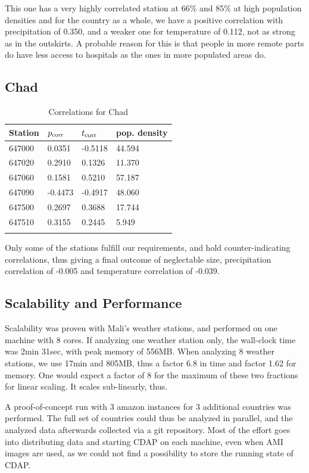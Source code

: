 \documentclass[
10pt, %
a4paper, %
oneside, %
headinclude,footinclude, %
useAMS,
usenatbib
]{template/mn2e}  %
\begin{document}
This one has a very highly correlated station at 66\% and 85\% at high population densities and for the country as a whole, we have a positive correlation with precipitation of 0.350, and a weaker one for temperature of 0.112, not as strong as in the outskirts. A probable reason for this is that people in more remote parts do have less access to hospitals as the ones in more populated areas do.

\subsection{Chad}
\begin{table}
    \caption{Correlations for Chad}
    \begin{tabular}{ l l l l }
        \hline\hline
        Station & $p_{\rm corr}$ & $t_{\rm corr}$ & pop. density\\
        \hline
        647000 &  0.0351 & -0.5118 & 44.594 \\
        647020 &  0.2910 &  0.1326 & 11.370 \\
        647060 &  0.1581 &  0.5210 & 57.187 \\
        647090 & -0.4473 & -0.4917 & 48.060 \\
        647500 &  0.2697 &  0.3688 & 17.744 \\
        647510 &  0.3155 &  0.2445 &  5.949 \\
        \hline
        \label{tab:CD}
    \end{tabular}
\end{table}


Only some of the stations fulfill our requirements, and hold counter-indicating correlations, thus giving a final outcome of neglectable size, precipitation correlation of -0.005 and temperature correlation of -0.039.


\subsection{Scalability and Performance}
Scalability was proven with Mali's weather stations, and performed on one machine with 8 cores. If analyzing one weather station only, the wall-clock time was 2min 31sec, with peak memory of 556MB.
When analyzing 8 weather stations, we use 17min and 805MB, thus a factor 6.8 in time and factor 1.62 for memory. One would expect a factor of 8 for the maximum of these two fractions for linear scaling. It scales sub-linearly, thus.

A proof-of-concept run with 3 amazon instances for 3 additional countries was performed. The full set of countries could thus be analyzed in parallel, and the analyzed data afterwards collected via a git repository. Most of the effort goes into distributing data and starting CDAP on each machine, even when AMI images are used, as we could not find a possibility to store the running state of CDAP.
\end{document}
